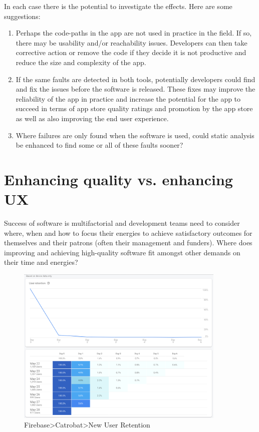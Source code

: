 In each case there is the potential to investigate the effects. Here are some suggestions:
\begin{enumerate}
    \item Perhaps the code-paths in the app are not used in practice in the field. If so, there may be usability and/or reachability issues. Developers can then take corrective action or remove the code if they decide it is not productive and reduce the size and complexity of the app.
    \item If the same faults are detected in both tools, potentially developers could find and fix the issues before the software is released. These fixes may improve the reliability of the app in practice and increase the potential for the app to succeed in terms of app store quality ratings and promotion by the app store as well as also improving the end user experience.
    \item Where failures are only found when the software is used, could static analysis be enhanced to find some or all of these faults sooner?
\end{enumerate}

\section{Enhancing quality vs. enhancing UX}\label{enhancing-quality-vs-enhancing-ux}
Success of software is multifactorial and development teams need to consider where, when and how to focus their energies to achieve satisfactory outcomes for themselves and their patrons (often their management and funders). Where does improving and achieving high-quality software fit amongst other demands on their time and energies?

\begin{figure}[ht]
    \centering
    \includegraphics[width=10cm]{images/firebase/Firebase-pocketcode-android-7-day-new-user-retention-29-may-2020.png}
    \caption{Firebase>Catrobat>New User Retention}
    \label{fig:Firebase-pocketcode-android-7-day-new-user-retention-29-may-2020}
\end{figure}

